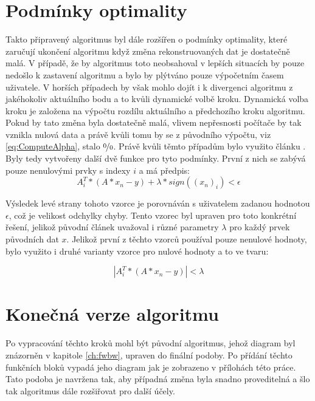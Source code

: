 \documentclass[FM,BP]{tulthesis}
\newcounter{Vzorce}
\begin{document}
\section{Podmínky optimality}
Takto připravený algoritmus byl dále rozšířen o podmínky optimality, které zaručují ukončení algoritmu když změna rekonstruovaných dat je dostatečně malá. V případě, že by algoritmus toto neobsahoval v lepších situacích by pouze nedošlo k zastavení algoritmu a bylo by plýtváno pouze výpočetním časem uživatele. V horších případech by však mohlo dojít i k divergenci algoritmu z jakéhokoliv aktuálního bodu a to kvůli dynamické volbě kroku. Dynamická volba kroku je založena na výpočtu rozdílu aktuálního a předchozího kroku algoritmu. Pokud by tato změna byla dostatečně malá, vlivem nepřesnosti počítače by tak vznikla nulová data a právě kvůli tomu by se z původního výpočtu, viz \ref{eq:ComputeAlpha}, stalo $\nicefrac{0}{0}$. Právě kvůli těmto případům bylo využito článku \cite{homotopy}. Byly tedy vytvořeny další dvě funkce pro tyto podmínky. První z nich se zabývá pouze nenulovými prvky s indexy $i$ a má předpis:
\begin{equation} \label{eq:homotopy1}  \tag{Vzorec \theVzorce}
A_{i}^{T}*(A*x_{n} - y) + \lambda * sign((x_{n})_{i}) < \epsilon
\end{equation}

Výsledek levé strany tohoto vzorce je porovnáván s uživatelem zadanou hodnotou $\epsilon$, což je velikost odchylky chyby. Tento vzorec byl upraven pro toto konkrétní řešení, jelikož původní článek uvažoval i různé parametry $\lambda$ pro každý prvek původních dat $x$. Jelikož první z těchto vzorců používal pouze nenulové hodnoty, bylo využito i druhé varianty vzorce pro nulové hodnoty a to ve tvaru:

\begin{equation} \label{eq:homotopy2}  \tag{Vzorec \theVzorce}
\left|A_{i}^{T}*(A*x_{n} - y)\right| < \lambda
\end{equation}

\section{Konečná verze algoritmu}
Po vypracování těchto kroků mohl být původní algoritmus, jehož diagram byl znázorněn v kapitole \ref{ch:fwbw}, upraven do finální podoby. Po přídání těchto funkčních bloků vypadá jeho diagram jak je zobrazeno v přílohách této práce. Tato podoba je navržena tak, aby případná změna byla snadno proveditelná a šlo tak algoritmus dále rozšiřovat pro další účely.
\end{document}
